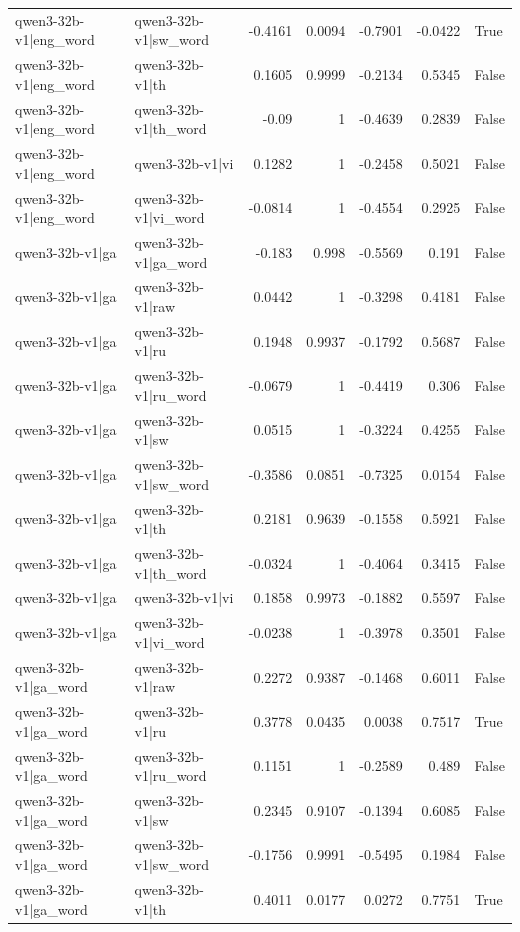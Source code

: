 \begin{table}
\begin{tabular}{l l r r r r l}
qwen3-32b-v1|eng_word & qwen3-32b-v1|sw_word & -0.4161 & 0.0094 & -0.7901 & -0.0422 & True \\
qwen3-32b-v1|eng_word & qwen3-32b-v1|th & 0.1605 & 0.9999 & -0.2134 & 0.5345 & False \\
qwen3-32b-v1|eng_word & qwen3-32b-v1|th_word & -0.09 & 1 & -0.4639 & 0.2839 & False \\
qwen3-32b-v1|eng_word & qwen3-32b-v1|vi & 0.1282 & 1 & -0.2458 & 0.5021 & False \\
qwen3-32b-v1|eng_word & qwen3-32b-v1|vi_word & -0.0814 & 1 & -0.4554 & 0.2925 & False \\
qwen3-32b-v1|ga & qwen3-32b-v1|ga_word & -0.183 & 0.998 & -0.5569 & 0.191 & False \\
qwen3-32b-v1|ga & qwen3-32b-v1|raw & 0.0442 & 1 & -0.3298 & 0.4181 & False \\
qwen3-32b-v1|ga & qwen3-32b-v1|ru & 0.1948 & 0.9937 & -0.1792 & 0.5687 & False \\
qwen3-32b-v1|ga & qwen3-32b-v1|ru_word & -0.0679 & 1 & -0.4419 & 0.306 & False \\
qwen3-32b-v1|ga & qwen3-32b-v1|sw & 0.0515 & 1 & -0.3224 & 0.4255 & False \\
qwen3-32b-v1|ga & qwen3-32b-v1|sw_word & -0.3586 & 0.0851 & -0.7325 & 0.0154 & False \\
qwen3-32b-v1|ga & qwen3-32b-v1|th & 0.2181 & 0.9639 & -0.1558 & 0.5921 & False \\
qwen3-32b-v1|ga & qwen3-32b-v1|th_word & -0.0324 & 1 & -0.4064 & 0.3415 & False \\
qwen3-32b-v1|ga & qwen3-32b-v1|vi & 0.1858 & 0.9973 & -0.1882 & 0.5597 & False \\
qwen3-32b-v1|ga & qwen3-32b-v1|vi_word & -0.0238 & 1 & -0.3978 & 0.3501 & False \\
qwen3-32b-v1|ga_word & qwen3-32b-v1|raw & 0.2272 & 0.9387 & -0.1468 & 0.6011 & False \\
qwen3-32b-v1|ga_word & qwen3-32b-v1|ru & 0.3778 & 0.0435 & 0.0038 & 0.7517 & True \\
qwen3-32b-v1|ga_word & qwen3-32b-v1|ru_word & 0.1151 & 1 & -0.2589 & 0.489 & False \\
qwen3-32b-v1|ga_word & qwen3-32b-v1|sw & 0.2345 & 0.9107 & -0.1394 & 0.6085 & False \\
qwen3-32b-v1|ga_word & qwen3-32b-v1|sw_word & -0.1756 & 0.9991 & -0.5495 & 0.1984 & False \\
qwen3-32b-v1|ga_word & qwen3-32b-v1|th & 0.4011 & 0.0177 & 0.0272 & 0.7751 & True \\

\end{tabular}
\end{table}
